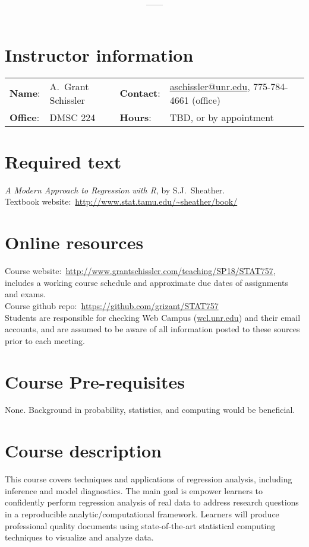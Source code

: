 \documentclass[11pt,onecolumn]{article}
\title{\textbf{\coursename}}
\author{{\semester}---{\roomnumb}---{\classtimes}}
\date{}
\makeatletter
\newcommand{\myname}{A.~Grant Schissler}
\newcommand{\myemail}{aschissler@unr.edu}
\newcommand{\office}{DMSC 224}
\newcommand{\officehours}{TBD, or by appointment}
\makeatother
\begin{document}
\maketitle


\section*{Instructor information}

\begin{tabular}{llll}
\textbf{Name}:&\myname & \textbf{Contact}:&\href{mailto:\myemail}{\myemail}, 775-784-4661 (office)\\
\textbf{Office}:&\office & \textbf{Hours}:&\officehours\\
\end{tabular}

\section*{Required text}
\emph{A Modern Approach to Regression with R}, by S.J.~Sheather. \\
Textbook website:~\url{http://www.stat.tamu.edu/~sheather/book/}

\section*{Online resources}
Course website:~\url{http://www.grantschissler.com/teaching/SP18/STAT757}, includes a working course schedule and approximate due dates of assignments and exams. \\
Course github repo:~\url{https://github.com/grizant/STAT757}\\
Students are responsible for checking Web Campus (\url{wcl.unr.edu}) and their email accounts, and are assumed to be aware of all information posted to these sources prior to each meeting.

\section*{Course Pre-requisites}
None. Background in probability, statistics, and computing would be beneficial.

\section*{Course description}
This course covers techniques and applications of regression analysis, including inference and model diagnostics. The main goal is empower learners to confidently perform regression analysis of real data to address research questions in a reproducible analytic/computational framework. Learners will produce professional quality documents using state-of-the-art statistical computing techniques to visualize and analyze data.
\end{document}
